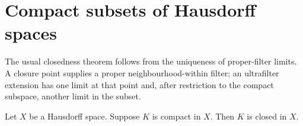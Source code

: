 \section{Compact subsets of Hausdorff spaces}






The usual closedness theorem follows from the uniqueness of proper-filter
limits.  A closure point supplies a proper neighbourhood-within filter; an
ultrafilter extension has one limit at that point and, after restriction to
the compact subspace, another limit in the subset.

\begin{theorem}\label{compact_subset_of_hausdorff_is_closed}
    Let $X$ be a Hausdorff space.
    Suppose $K$ is compact in $X$.
    Then $K$ is closed in $X$.
\end{theorem}

